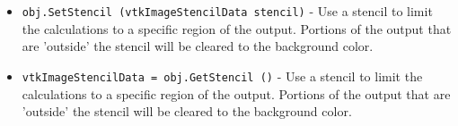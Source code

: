 \begin{itemize}
\item  \verb|obj.SetStencil (vtkImageStencilData stencil)| -  Use a stencil to limit the calculations to a specific region of
 the output.  Portions of the output that are 'outside' the stencil
 will be cleared to the background color.  

\item  \verb|vtkImageStencilData = obj.GetStencil ()| -  Use a stencil to limit the calculations to a specific region of
 the output.  Portions of the output that are 'outside' the stencil
 will be cleared to the background color.  

\end{itemize}
